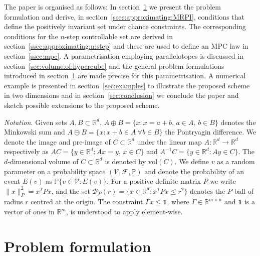\documentclass{ifacconf}
\providecommand{\vol}{\text{vol}}
\providecommand{\B}{\mathcal B}
\providecommand{\F}{\mathscr F}
\providecommand{\V}{\mathcal V}
\providecommand{\PP}{\mathbb P}
\providecommand{\RR}{\mathbb R}
\providecommand{\bfa}[1]{\mathbf{#1}}
\begin{document}
%
The paper is organised  as follows:
In section~\ref{sec:setup} we present the problem formulation and derive, in section~\ref{ssec:approximating:MRPI}, conditions that define the positively invariant set under chance constraints. The corresponding conditions for the $n$-step controllable set are derived in section~\ref{ssec:approximating:n:step} and these are used to define an MPC law in section~\ref{ssec:mpc}.
%
A parametrisation employing parallelotopes is discussed in section~\ref{sec:volume:of:hypercube} and the general problem formulations introduced in section~\ref{sec:setup} are made precise for this parametrisation.
%
A numerical example is presented in section~\ref{sec:examples} to illustrate the proposed scheme in two dimensions and in section~\ref{sec:conclusion} we conclude the paper and sketch possible extensions to the proposed scheme.

\textit{Notation.} Given sets $A,B\subset\RR^d$, $A\oplus B = \{x:x=a+b,\, a\in A,\, b\in B\}$ denotes the Minkowski sum and $A\ominus B = \{x: x+b \in A \ \forall b\in B\}$ the Pontryagin difference. We denote the image and pre-image of $C\subset\RR^d$ under the linear map $A:\RR^d\rightarrow\RR^d$ respectively as $AC = \{y\in\RR^d:Ax=y,\, x\in C\}$ and $A^{-1}C = \{y\in\RR^d:Ay\in C\}$. The $d$-dimensional volume of $C\subset\RR^d$ is denoted by $\vol(C)$. 
%
We define $v$ as a random parameter on a probability space $(\V,\F,\PP)$ and denote the probability of an event $E(v)$ as $\PP\{v\in\V : E(v)\}$.
%
For a positive definite matrix $P$ we write $\|x\|_P^2 = x^TPx$, and the set $\B_P(r) = \{x\in\RR^d:x^TPx\leq r^2\}$ denotes the $P$-ball of radius $r$ centred at the origin. The constraint $\Gamma x\leq \bfa{1}$, where $\Gamma\in\RR^{m\times n}$ and $\bfa{1}$ is a vector of ones in $\RR^m$, is understood to apply element-wise.


\section{Problem formulation}\label{sec:setup}
%
\end{document}
